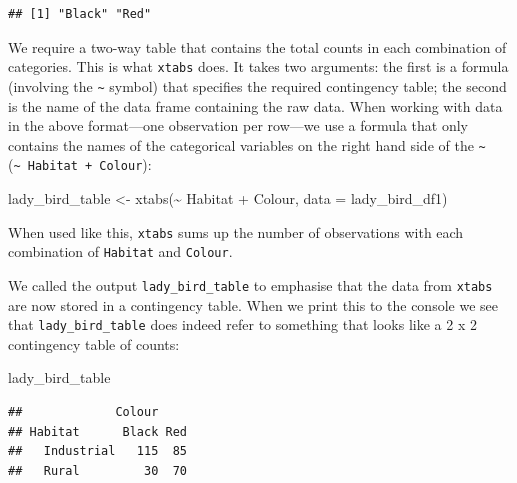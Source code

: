 \documentclass[
]{book}
\newenvironment{Shaded}{\begin{snugshade}}{\end{snugshade}}
\newcommand{\AttributeTok}[1]{\textcolor[rgb]{0.77,0.63,0.00}{#1}}
\newcommand{\FunctionTok}[1]{\textcolor[rgb]{0.00,0.00,0.00}{#1}}
\newcommand{\NormalTok}[1]{#1}
\newcommand{\OtherTok}[1]{\textcolor[rgb]{0.56,0.35,0.01}{#1}}
\newcommand{\SpecialCharTok}[1]{\textcolor[rgb]{0.00,0.00,0.00}{#1}}
\begin{document}
\begin{Shaded}
\end{Shaded}

\begin{verbatim}
## [1] "Black" "Red"
\end{verbatim}

We require a two-way table that contains the total counts in each combination of categories. This is what \texttt{xtabs} does. It takes two arguments: the first is a formula (involving the \texttt{\textasciitilde{}} symbol) that specifies the required contingency table; the second is the name of the data frame containing the raw data. When working with data in the above format---one observation per row---we use a formula that only contains the names of the categorical variables on the right hand side of the \texttt{\textasciitilde{}} (\texttt{\textasciitilde{}\ Habitat\ +\ Colour}):

\begin{Shaded}
\begin{Highlighting}[]
\NormalTok{lady\_bird\_table }\OtherTok{\textless{}{-}} \FunctionTok{xtabs}\NormalTok{(}\SpecialCharTok{\textasciitilde{}}\NormalTok{ Habitat }\SpecialCharTok{+}\NormalTok{ Colour, }\AttributeTok{data =}\NormalTok{ lady\_bird\_df1)}
\end{Highlighting}
\end{Shaded}

When used like this, \texttt{xtabs} sums up the number of observations with each combination of \texttt{Habitat} and \texttt{Colour}.

We called the output \texttt{lady\_bird\_table} to emphasise that the data from \texttt{xtabs} are now stored in a contingency table. When we print this to the console we see that \texttt{lady\_bird\_table} does indeed refer to something that looks like a 2 x 2 contingency table of counts:

\begin{Shaded}
\begin{Highlighting}[]
\NormalTok{lady\_bird\_table}
\end{Highlighting}
\end{Shaded}

\begin{verbatim}
##             Colour
## Habitat      Black Red
##   Industrial   115  85
##   Rural         30  70
\end{verbatim}
\end{document}
